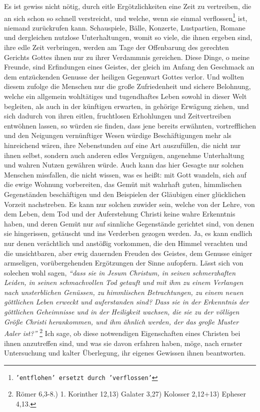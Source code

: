 Es ist gewiss nicht nötig, durch eitle Ergötzlichkeiten eine Zeit zu vertreiben,
die an sich schon so schnell verstreicht, und welche, wenn sie einmal verflossen\footnote{\texttt{'entflohen' ersetzt 
durch 'verflossen'}} 
ist, niemand zurückrufen kann. Schauspiele, 
Bälle, Konzerte, Lustpartien, Romane
und dergleichen nutzlose Unterhaltungen, womit so viele, die ihnen ergeben sind,
ihre edle Zeit verbringen, werden am Tage der Offenbarung des gerechten Gerichts
Gottes ihnen nur zu ihrer Verdammnis gereichen. 
Diese Dinge, o meine Freunde,
sind Erfindungen eines Geistes, der gleich im Anfang den Geschmack an dem
entzückenden Genusse der heiligen Gegenwart Gottes verlor. Und wollten diesem
zufolge die Menschen nur die große Zufriedenheit und sichere Belohnung, welche
ein allgemein  wohltätiges und tugendhaftes Leben sowohl in dieser Welt
begleiten, als auch in der künftigen erwarten, in gehörige Erwägung ziehen, und
sich dadurch von ihren eitlen, fruchtlosen Erhohlungen und Zeitvertreiben
entwöhnen lassen, so würden sie finden, dass jene bereits erwähnten,
vortrefflichen und den Neigungen vernünftiger Wesen würdige Beschäftigungen
mehr als hinreichend wären, ihre Nebenstunden auf eine Art auszufüllen, die
nicht nur ihnen selbst, sondern auch anderen edles Vergnügen, angenehme
Unterhaltung und wahren Nutzen gewähren würde. Auch kann das hier Gesagte nur
solchen Menschen missfallen, die nicht wissen, was es heißt: mit Gott wandeln,
sich auf die ewige Wohnung vorbereiten, das Gemüt mit wahrhaft guten,
himmlischen Gegenständen beschäftigen und den Beispielen der Gläubigen einer
glücklichen Vorzeit nachstreben. Es kann nur solchen zuwider sein, welche von
der Lehre, von dem Leben, dem Tod und der Auferstehung Christi keine 
wahre
Erkenntnis haben, und deren Gemüt nur auf sinnliche Gegenstände gerichtet
sind, von denen sie hingerissen, getäuscht und ins Verderben gezogen werden. Ja,
es kann endlich nur denen verächtlich und anstößig vorkommen, die den Himmel
verachten und die unsichtbaren, aber ewig dauernden Freuden des Geistes, dem
Genusse einiger armseligen, vorübergehenden Ergötzungen der Sinne aufopfern.
Lässt sich von solechen wohl sagen,
\textit{"`dass sie in Jesum Christum, in seinen
schmerzhaften Leiden, in seinen schmachvollen Tod getauft und mit ihm zu einem
Verlangen nach unsterblichen Genüssen, zu himmlischen Betrachtungen, zu einem
neuen göttlichen Leben erweckt und auferstanden sind? Dass sie in der
Erkenntnis der göttlichen Geheimnisse und in der Heiligkeit wachsen, die sie
zu der völligen Größe Christi herankommen, und ihm ähnlich werden, der das große
Muster Aaler ist?"'}
\footnote{Römer 6,3-8.) 1. Korinther 12,13) Galater 3,27) Kolosser 2,12+13)
Epheser 4,13.}
Ich sage, ob diese notwendigen Eigenschaften eines Christen bei
ihnen anzutreffen sind, und was sie davon erfahren haben, möge, nach ernster
Untersuchung und kalter Überlegung, ihr eigenes Gewissen ihnen beantworten.

